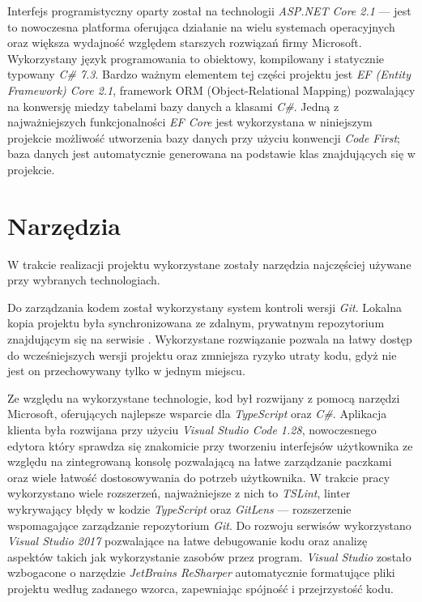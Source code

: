 \documentclass[eng,printmode,openany]{mgr}
\begin{document}
Interfejs programistyczny oparty został na technologii \textit{ASP.NET Core 2.1} — jest to nowoczesna platforma oferująca działanie na wielu systemach operacyjnych oraz większa wydajność względem starszych rozwiązań firmy Microsoft. Wykorzystany język programowania to obiektowy, kompilowany i statycznie typowany \textit{C\# 7.3}. Bardzo ważnym elementem tej części projektu jest \textit{EF (Entity Framework) Core 2.1}, framework ORM (Object-Relational Mapping) pozwalający na konwersję miedzy tabelami bazy danych a klasami \textit{C\#}. Jedną z najważniejszych funkcjonalności \textit{EF Core} jest wykorzystana w niniejszym projekcie możliwość utworzenia bazy danych przy użyciu konwencji \textit{Code First}; baza danych jest automatycznie generowana na podstawie klas  znajdujących się w projekcie. 
\section{Narzędzia}
W trakcie realizacji projektu wykorzystane zostały narzędzia najczęściej używane przy wybranych technologiach.

Do zarządzania kodem został wykorzystany system kontroli wersji \textit{Git}. Lokalna kopia projektu była synchronizowana ze zdalnym, prywatnym repozytorium znajdującym się na serwisie . Wykorzystane rozwiązanie pozwala na łatwy dostęp do wcześniejszych wersji projektu oraz zmniejsza ryzyko utraty kodu, gdyż nie jest on przechowywany tylko w jednym miejscu.

Ze względu na wykorzystane technologie, kod był rozwijany z pomocą narzędzi Microsoft, oferujących najlepsze wsparcie dla \textit{TypeScript} oraz \textit{C\#}. Aplikacja klienta była rozwijana przy użyciu \textit{Visual Studio Code 1.28}, nowoczesnego edytora który sprawdza się znakomicie przy tworzeniu interfejsów użytkownika ze względu na zintegrowaną konsolę pozwalającą na łatwe zarządzanie paczkami oraz wiele łatwość dostosowywania do potrzeb użytkownika. W trakcie pracy wykorzystano wiele rozszerzeń, najważniejsze z nich to \textit{TSLint}, linter wykrywający błędy w kodzie \textit{TypeScript} oraz \textit{GitLens} — rozszerzenie wspomagające zarządzanie repozytorium \textit{Git}. Do rozwoju serwisów wykorzystano \textit{Visual Studio 2017} pozwalające na łatwe debugowanie kodu oraz analizę aspektów takich jak wykorzystanie zasobów przez program. \textit{Visual Studio} zostało wzbogacone o narzędzie \textit{JetBrains ReSharper} automatycznie formatujące pliki projektu według zadanego wzorca, zapewniając spójność i przejrzystość kodu.
\end{document}
